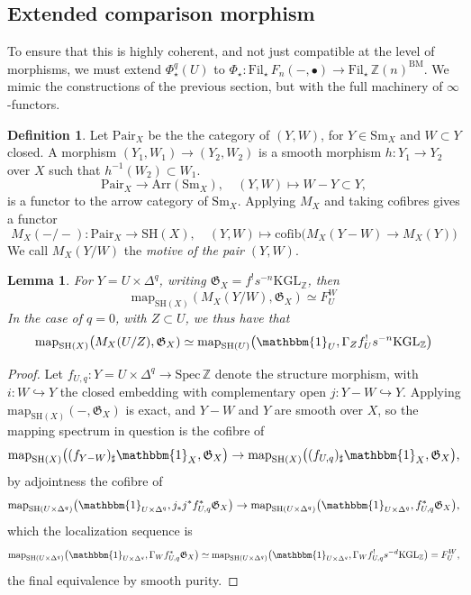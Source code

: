 \documentclass[11pt, twoside]{article}
\numberwithin{equation}{section}
\newtheorem{lemma}[equation]{Lemma}
\theoremstyle{definition}
\newtheorem{definition}[equation]{Definition}
\newcommand{\bb}[1]{\mathbb{#1}}
\newcommand{\spec}{\mathrm{Spec} \,}
\newcommand{\mf}[1]{\mathfrak{#1}}
\newcommand{\map}{\mathrm{map}}
\newcommand{\fil}{\mathrm{Fil}}
\newcommand{\Kgl}{\mathrm{KGL}}
\newcommand{\sh}{\mathrm{SH}}
\newcommand{\bm}{\mathrm{BM}}
\newcommand{\sm}{\mathrm{Sm}}
\begin{document}
\subsection{Extended comparison morphism}

To ensure that this is highly coherent, and not just compatible at the level of morphisms, we must extend \(\Phi_\star^q(U)\) to \(\Phi_\star \colon \fil_\star \, F_n( -, \bullet) \to \fil_\star \, \bb{Z}(n)^\bm\). We mimic the constructions of the previous section, but with the full machinery of \(\infty\)-functors.

\begin{definition}
Let \(\mathrm{Pair}_X\) be the the category of \((Y, W)\), for \(Y \in \sm_X\) and \(W \subset Y\) closed. A morphism \((Y_1, W_1) \to (Y_2, W_2)\) is a smooth morphism \(h \colon Y_1 \to Y_2\) over \(X\) such that \(h^{- 1}(W_2) \subset W_1\). 
\[\mathrm{Pair}_X \to \mathrm{Arr}(\sm_X), \quad (Y, W) \mapsto W - Y \subset Y,\]
is a functor to the arrow category of \(\sm_X\). Applying \(M_X\) and taking cofibres gives a functor 
\[M_X(-/-) \colon \mathrm{Pair}_X \to \sh(X), \quad (Y, W) \mapsto \mathrm{cofib}\big(M_X(Y - W) \to M_X(Y)\big)\]
We call \(M_X(Y/W)\) the \emph{motive of the pair \((Y, W)\)}.
\end{definition}

\begin{lemma}\label{lemm:mot-pair-eq}
For \(Y = U \times \Delta^q\), writing \(\mf{G}_X = f^! s^{- n} \Kgl_\bb{Z}\), then 
\begin{equation}\label{eq:mot-pair-map}
\map_{\sh(X)}(M_X(Y/W), \mf{G}_X) \simeq F_U^W
\end{equation}
In the case of \(q = 0\), with \(Z \subset U\), we thus have that 
\[\map_{\sh(X)}\big(M_X(U/Z), \mf{G}_X) \simeq \map_{\sh(U)}\big(\mathbbm{1}_U, \Gamma_Z f_U^! s^{- n} \Kgl_\bb{Z}\big)\]
\end{lemma}

\begin{proof}
Let \(f_{U, q} \colon Y = U \times \Delta^q \to \spec \bb{Z}\) denote the structure morphism, with \(i \colon W \hookrightarrow Y\) the closed embedding with complementary open \(j \colon Y - W \hookrightarrow Y\). Applying \(\map_{\sh(X)}( -, \mf{G}_X)\) is exact, and \(Y - W\) and \(Y\) are smooth over \(X\), so the mapping spectrum in question is the cofibre of 
\[\map_{\sh(X)}\big((f_{Y - W})_\sharp \mathbbm{1}_X, \mf{G}_X\big) \to \map_{\sh(X)}\big((f_{U, q})_\sharp \mathbbm{1}_X, \mf{G}_X\big),\]
by adjointness the cofibre of
\[\map_{\sh(U \times \Delta^q)}\big(\mathbbm{1}_{U \times \Delta^q}, j_*j^* f_{U, q}^* \mf{G}_X\big) \to \map_{\sh(U \times \Delta^q)}\big(\mathbbm{1}_{U \times \Delta^q}, f_{U, q}^* \mf{G}_X\big),\]
which the localization sequence is  
\[\map_{\sh(U \times \Delta^q)}\big(\mathbbm{1}_{U \times \Delta^q}, \Gamma_W f_{U, q}^* \mf{G}_X\big) \simeq \map_{\sh(U \times \Delta^q)}\big(\mathbbm{1}_{U \times \Delta^q}, \Gamma_W f_{U, q}^! s^{- d} \Kgl_\bb{Z}\big) = F_U^W,\]
the final equivalence by smooth purity.
\end{proof}
\end{document}
